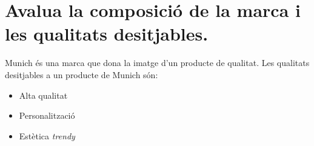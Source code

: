  \section{Avalua la composició de la marca i les qualitats desitjables.}

 Munich és una marca que dona la imatge d'un producte de qualitat.
 Les qualitats desitjables a un producte de Munich són:

\begin{itemize}
  \item Alta qualitat
  \item Personalització
  \item Estètica \textit{trendy}
\end{itemize}

